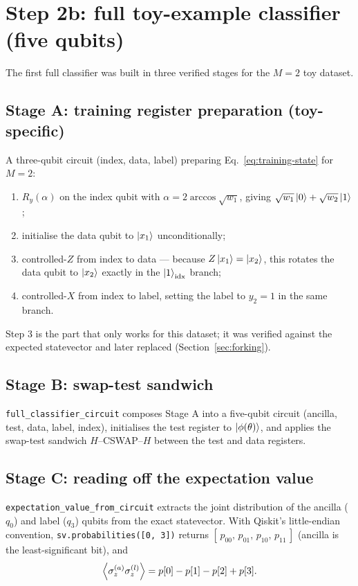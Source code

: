 \documentclass[11pt,a4paper]{article}
\begin{document}
\section{Step 2b: full toy-example classifier (five qubits)}

The first full classifier was built in three verified stages for the
$M = 2$ toy dataset.

\subsection{Stage A: training register preparation (toy-specific)}

A three-qubit circuit (index, data, label) preparing
Eq.~\eqref{eq:training-state} for $M = 2$:
\begin{enumerate}
  \item $R_y(\alpha)$ on the index qubit with
        $\alpha = 2\arccos\sqrt{w_1}$, giving
        $\sqrt{w_1}\ket{0} + \sqrt{w_2}\ket{1}$;
  \item initialise the data qubit to $\ket{x_1}$ unconditionally;
  \item controlled-$Z$ from index to data --- because
        $Z\ket{x_1} = \ket{x_2}$, this rotates the data qubit to
        $\ket{x_2}$ exactly in the $\ket{1}_{\text{idx}}$ branch;
  \item controlled-$X$ from index to label, setting the label to
        $y_2 = 1$ in the same branch.
\end{enumerate}
Step 3 is the part that only works for this dataset; it was verified
against the expected statevector and later replaced (Section~\ref{sec:forking}).

\subsection{Stage B: swap-test sandwich}

\texttt{full\_classifier\_circuit} composes Stage A into a five-qubit
circuit (ancilla, test, data, label, index), initialises the test register
to $\ket{\phi(\theta)}$, and applies the swap-test sandwich
$H$--CSWAP--$H$ between the test and data registers.

\subsection{Stage C: reading off the expectation value}

\texttt{expectation\_value\_from\_circuit} extracts the joint distribution
of the ancilla ($q_0$) and label ($q_3$) qubits from the exact statevector.
With Qiskit's little-endian convention,
\texttt{sv.probabilities([0, 3])} returns
$[\,p_{00},\, p_{01},\, p_{10},\, p_{11}\,]$ (ancilla is the
least-significant bit), and
\begin{equation}
  \expval{\sigma_z^{(a)} \sigma_z^{(l)}} = p[0] - p[1] - p[2] + p[3].
\end{equation}
\end{document}
